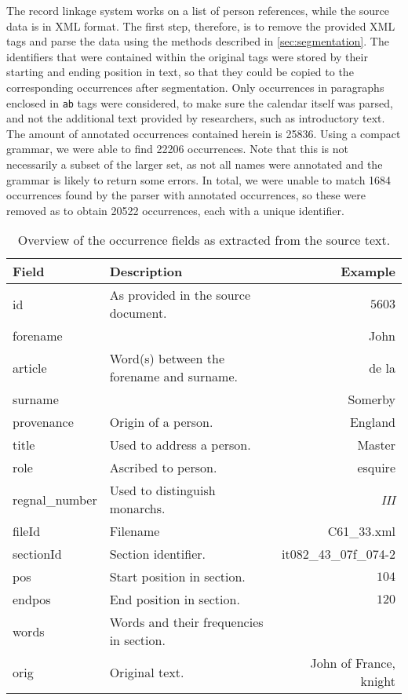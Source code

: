 The record linkage system works on a list of person references, while the source data is in XML format.
The first step, therefore, is to remove the provided XML tags and parse the data using the methods described in \cref{sec:segmentation}.
The identifiers that were contained within the original tags were stored by their starting and ending position in text, so that they could be copied to the corresponding occurrences after segmentation.
Only occurrences in paragraphs enclosed in \texttt{ab} tags were considered, to make sure the calendar itself was parsed, and not the additional text provided by researchers, such as introductory text.
The amount of annotated occurrences contained herein is \num{25836}.
Using a compact grammar, we were able to find \num{22206} occurrences.
Note that this is not necessarily a subset of the larger set, as not all names were annotated and the grammar is likely to return some errors. 
In total, we were unable to match \num{1684} occurrences found by the parser with annotated occurrences, so these were removed as to obtain \num{20522} occurrences, each with a unique identifier.

\begin{table}
    \footnotesize
    \centering
    \caption{Overview of the occurrence fields as extracted from the source text.}
    \label{tab:occurrence_overview}
    \begin{tabularx}{\textwidth}{l X r}
        \toprule
        \textbf{Field} & \textbf{Description} & \textbf{Example} \\
        \midrule
        id & As provided in the source document. & $5603$ \\
        forename & & John \\
        article & Word(s) between the forename and surname. & de la \\
        surname & & Somerby \\
        provenance & Origin of a person. & England \\
        title & Used to address a person. & Master \\
        role & Ascribed to person. & esquire \\
        regnal\_number & Used to distinguish monarchs. & \emph{III} \\
        fileId & Filename & C61\_33.xml \\
        sectionId & Section identifier. & it082\_43\_07f\_074-2 \\
        pos & Start position in section. & $104$ \\
        endpos & End position in section. & $120$ \\
        words & Words and their frequencies in section. & \\
        orig & Original text. & John of France, knight \\
        \bottomrule
    \end{tabularx}
\end{table}

